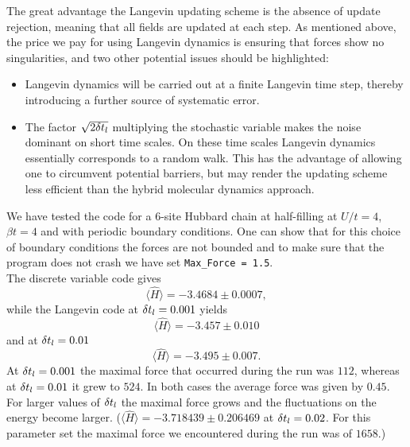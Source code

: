 The great advantage the Langevin updating scheme is the absence of update rejection, meaning that all fields are updated at each step. As mentioned above, the price we pay for using Langevin dynamics is ensuring that forces show no singularities, and two other potential issues should be highlighted:
\begin{itemize}
\item   Langevin dynamics will be carried out at a finite  Langevin time step, thereby introducing a further source of systematic error.
\item   The factor $\sqrt{2 \delta t_{l}} $   multiplying the stochastic variable makes the  noise dominant  on short time scales.  On these time scales  Langevin dynamics essentially  corresponds to a random walk. This has the advantage of allowing one to circumvent potential barriers, but may render the updating scheme less efficient than the hybrid molecular dynamics approach.
\end{itemize}

We have tested the code for a 6-site Hubbard chain at half-filling  at $U/t = 4$,  $\beta t = 4$    and with periodic boundary conditions.   One can show that for this choice of boundary conditions the   forces are not bounded 
and to make sure that the program does not   crash we have  set \texttt{Max\_Force = 1.5}.\\
The discrete variable code gives
\begin{equation}
 \langle  \hat{H} \rangle  =  -3.4684 \pm 0.0007,
\end{equation} 
while the Langevin code at $ \delta t_{l} = 0.001$  yields 
\begin{equation}
 \langle  \hat{H} \rangle  =  -3.457 \pm 0.010 
\end{equation} 
and at $ \delta t_{l} = 0.01$
\begin{equation}
 \langle  \hat{H} \rangle  = -3.495 \pm 0.007\text{.}
\end{equation} 
 At $ \delta t_{l} = 0.001$   the maximal force that occurred during the run was 
$ 112$, whereas at $ \delta t_{l} = 0.01$ it grew to $524$.    In both cases the average force was given by $0.45$.   For larger values of  $ \delta t_{l} $ the maximal force grows and the fluctuations on the energy become  larger.  
($ \langle  \hat{H} \rangle  =  -3.718439    \pm   0.206469 $  at $ \delta t_{l} = 0.02$. For this parameter set  the maximal force we encountered during the run was of $1658$.)

